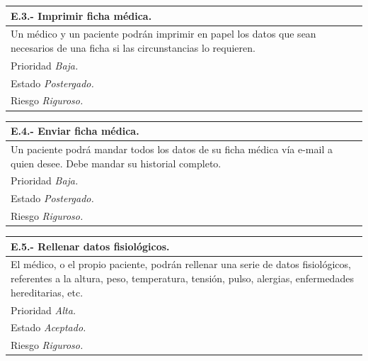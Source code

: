 \documentclass[a4paper,oneside,11pt]{book}
\begin{document}
\begin{center}
\begin{tabulary}{15cm}{|L|}
	\hline
		\bf{E.3.- Imprimir ficha médica.} \\
	\hline
		Un médico y un paciente podrán imprimir en papel los datos que sean necesarios de una ficha si las circunstancias lo requieren. \\
	\hline
		Prioridad \textit{Baja.} \\
	\hline
		Estado \textit{Postergado.} \\
	\hline
		Riesgo \textit{Riguroso.} \\
	\hline
\end{tabulary}
\end{center}

\begin{center}
\begin{tabulary}{15cm}{|L|}
	\hline
		\bf{E.4.- Enviar ficha médica.} \\
	\hline
		Un paciente podrá mandar todos los datos de su ficha médica vía e-mail a quien desee. Debe mandar su historial completo. \\
	\hline
		Prioridad \textit{Baja.} \\
	\hline
		Estado \textit{Postergado.} \\
	\hline
		Riesgo \textit{Riguroso.} \\
	\hline
\end{tabulary}
\end{center}

\begin{center}
\begin{tabulary}{15cm}{|L|}
	\hline
		\bf{E.5.- Rellenar datos fisiológicos.} \\
	\hline
		El médico, o el propio paciente, podrán rellenar una serie de datos fisiológicos, referentes a la altura, peso, temperatura, tensión, pulso, alergias, enfermedades hereditarias, etc. \\
	\hline
		Prioridad \textit{Alta.} \\
	\hline
		Estado \textit{Aceptado.} \\
	\hline
		Riesgo \textit{Riguroso.} \\
	\hline
\end{tabulary}
\end{center}
\end{document}
